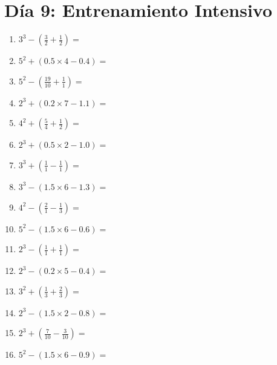 \documentclass[12pt]{article}
\begin{document}
\section*{Día 9: Entrenamiento Intensivo}
\begin{enumerate}
\item \large $ 3^{3} - (\frac{3}{2} + \frac{1}{2}) = $ \vspace{1.6cm}
\item \large $ 5^{2} + (0.5 \times 4 - 0.4) = $ \vspace{1.6cm}
\item \large $ 5^{2} - (\frac{19}{10} + \frac{1}{1}) = $ \vspace{1.6cm}
\item \large $ 2^{3} + (0.2 \times 7 - 1.1) = $ \vspace{1.6cm}
\item \large $ 4^{2} + (\frac{5}{4} + \frac{1}{2}) = $ \vspace{1.6cm}
\item \large $ 2^{3} + (0.5 \times 2 - 1.0) = $ \vspace{1.6cm}
\item \large $ 3^{3} + (\frac{1}{1} - \frac{1}{1}) = $ \vspace{1.6cm}
\item \large $ 3^{3} - (1.5 \times 6 - 1.3) = $ \vspace{1.6cm}
\item \large $ 4^{2} - (\frac{2}{1} - \frac{1}{3}) = $ \vspace{1.6cm}
\item \large $ 5^{2} - (1.5 \times 6 - 0.6) = $ \vspace{1.6cm}
\newpage
\item \large $ 2^{3} - (\frac{1}{1} + \frac{1}{1}) = $ \vspace{1.6cm}
\item \large $ 2^{3} - (0.2 \times 5 - 0.4) = $ \vspace{1.6cm}
\item \large $ 3^{2} + (\frac{1}{3} + \frac{2}{3}) = $ \vspace{1.6cm}
\item \large $ 2^{3} - (1.5 \times 2 - 0.8) = $ \vspace{1.6cm}
\item \large $ 2^{3} + (\frac{7}{10} - \frac{3}{10}) = $ \vspace{1.6cm}
\item \large $ 5^{2} - (1.5 \times 6 - 0.9) = $ \vspace{1.6cm}

\end{enumerate}
\end{document}
